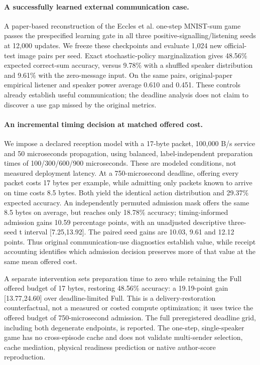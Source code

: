 \paragraph{A successfully learned external communication case.}
A paper-based reconstruction of the Eccles et al. one-step MNIST-sum game passes the prespecified learning gate in all three positive-signalling/listening seeds at 12,000 updates. We freeze these checkpoints and evaluate 1,024 new official-test image pairs per seed. Exact stochastic-policy marginalization gives 48.56\% expected correct-sum accuracy, versus 9.78\% with a shuffled speaker distribution and 9.61\% with the zero-message input. On the same pairs, original-paper empirical listener and speaker power average 0.610 and 0.451. These controls already establish useful communication; the deadline analysis does not claim to discover a use gap missed by the original metrics.

\paragraph{An incremental timing decision at matched offered cost.}
We impose a declared reception model with a 17-byte packet, 100,000 B/s service and 50 microseconds propagation, using balanced, label-independent preparation times of 100/300/600/900 microseconds. These are modeled conditions, not measured deployment latency. At a 750-microsecond deadline, offering every packet costs 17 bytes per example, while admitting only packets known to arrive on time costs 8.5 bytes. Both yield the identical action distribution and 29.37\% expected accuracy. An independently permuted admission mask offers the same 8.5 bytes on average, but reaches only 18.78\% accuracy; timing-informed admission gains 10.59 percentage points, with an unadjusted descriptive three-seed t interval [7.25,13.92]. The paired seed gains are 10.03, 9.61 and 12.12 points. Thus original communication-use diagnostics establish value, while receipt accounting identifies which admission decision preserves more of that value at the same mean offered cost.

A separate intervention sets preparation time to zero while retaining the Full offered budget of 17 bytes, restoring 48.56\% accuracy: a 19.19-point gain [13.77,24.60] over deadline-limited Full. This is a delivery-restoration counterfactual, not a measured or costed compute optimization; it uses twice the offered budget of 750-microsecond admission. The full preregistered deadline grid, including both degenerate endpoints, is reported. The one-step, single-speaker game has no cross-episode cache and does not validate multi-sender selection, cache mediation, physical readiness prediction or native author-score reproduction.
